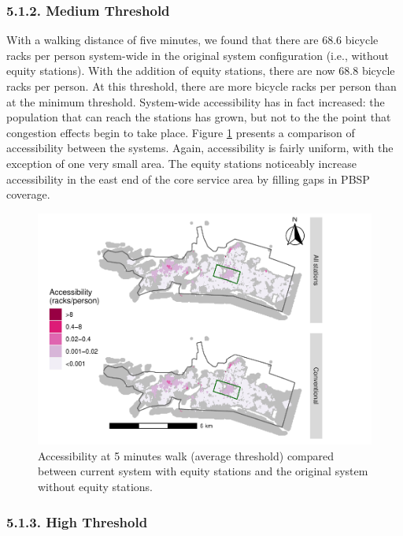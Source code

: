 \documentclass[]{elsarticle} %
\begin{document}
\hypertarget{medium-threshold}{%
\subsubsection{5.1.2. Medium Threshold}\label{medium-threshold}}

With a walking distance of five minutes, we found that there are 68.6
bicycle racks per person system-wide in the original system
configuration (i.e., without equity stations). With the addition of
equity stations, there are now 68.8 bicycle racks per person. At this
threshold, there are more bicycle racks per person than at the minimum
threshold. System-wide accessibility has in fact increased: the
population that can reach the stations has grown, but not to the the
point that congestion effects begin to take place. Figure
\ref{fig:figure-7} presents a comparison of accessibility between the
systems. Again, accessibility is fairly uniform, with the exception of
one very small area. The equity stations noticeably increase
accessibility in the east end of the core service area by filling gaps
in PBSP coverage.

\begin{figure}

{\centering \includegraphics[width=0.9\linewidth]{Bike-share-spatial-equity_files/figure-latex/figure-7-1} 

}

\caption{Accessibility at 5 minutes walk (average threshold) compared between current system with equity stations and the original system without equity stations.}\label{fig:figure-7}
\end{figure}

\hypertarget{high-threshold}{%
\subsubsection{5.1.3. High Threshold}\label{high-threshold}}
\end{document}
